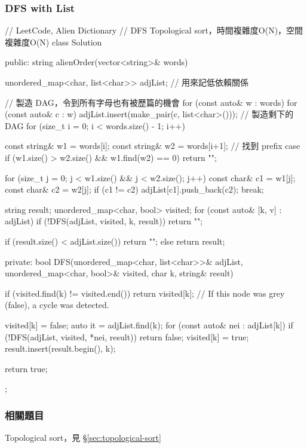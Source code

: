 \subsubsection{DFS with List}
\begin{Code}
// LeetCode, Alien Dictionary
// DFS Topological sort，時間複雜度O(N)，空間複雜度O(N)
class Solution {
public:
    string alienOrder(vector<string>& words) {
        unordered_map<char, list<char>> adjList; // 用來記低依賴關係
        
        // 製造 DAG，令到所有字母也有被歷篇的機會
        for (const auto& w : words)
            for (const auto& c : w)
                adjList.insert(make_pair(c, list<char>()));
        // 製造剩下的 DAG
        for (size_t i = 0; i < words.size() - 1; i++)
        {
            const string& w1 = words[i];
            const string& w2 = words[i+1];
            // 找到 prefix case
            if (w1.size() > w2.size() && w1.find(w2) == 0) return "";
            
            for (size_t j = 0; j < w1.size() && j < w2.size(); j++)
            {
                const char& c1 = w1[j];
                const char& c2 = w2[j];
                if (c1 != c2)
                {
                    adjList[c1].push_back(c2);
                    break;
                }
            }
        }
        
        string result;
        unordered_map<char, bool> visited;
        for (const auto& [k, v] : adjList)
        {
            if (!DFS(adjList, visited, k, result))
                return "";
        }
        
        if (result.size() < adjList.size())
            return "";
        else
            return result;
    }
private:
    bool DFS(unordered_map<char, list<char>>& adjList, unordered_map<char, bool>& visited, char k, string& result)
    {
        if (visited.find(k) != visited.end())
            return visited[k]; // If this node was grey (false), a cycle was detected.
        
        visited[k] = false;
        auto it = adjList.find(k);
        for (const auto& nei : adjList[k])
        {
            if (!DFS(adjList, visited, *nei, result)) return false;
        }
        visited[k] = true;
        result.insert(result.begin(), k);
        
        return true;
    }
};

\end{Code}

\subsubsection{相關題目}
\begindot
\item Topological sort，見 \S \ref{sec:topological-sort}
\myenddot

